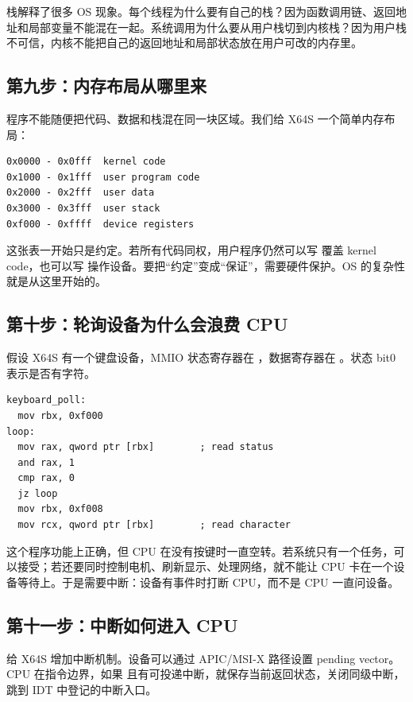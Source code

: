 栈解释了很多 OS 现象。每个线程为什么要有自己的栈？因为函数调用链、返回地址和局部变量不能混在一起。系统调用为什么要从用户栈切到内核栈？因为用户栈不可信，内核不能把自己的返回地址和局部状态放在用户可改的内存里。

\subsection{第九步：内存布局从哪里来}

程序不能随便把代码、数据和栈混在同一块区域。我们给 X64S 一个简单内存布局：

\begin{lstlisting}
0x0000 - 0x0fff  kernel code
0x1000 - 0x1fff  user program code
0x2000 - 0x2fff  user data
0x3000 - 0x3fff  user stack
0xf000 - 0xffff  device registers
\end{lstlisting}

这张表一开始只是约定。若所有代码同权，用户程序仍然可以写  覆盖 kernel code，也可以写  操作设备。要把“约定”变成“保证”，需要硬件保护。OS 的复杂性就是从这里开始的。

\subsection{第十步：轮询设备为什么会浪费 CPU}

假设 X64S 有一个键盘设备，MMIO 状态寄存器在 ，数据寄存器在 。状态 bit0 表示是否有字符。

\begin{lstlisting}
keyboard_poll:
  mov rbx, 0xf000
loop:
  mov rax, qword ptr [rbx]        ; read status
  and rax, 1
  cmp rax, 0
  jz loop
  mov rbx, 0xf008
  mov rcx, qword ptr [rbx]        ; read character
\end{lstlisting}

这个程序功能上正确，但 CPU 在没有按键时一直空转。若系统只有一个任务，可以接受；若还要同时控制电机、刷新显示、处理网络，就不能让 CPU 卡在一个设备等待上。于是需要中断：设备有事件时打断 CPU，而不是 CPU 一直问设备。

\subsection{第十一步：中断如何进入 CPU}

给 X64S 增加中断机制。设备可以通过 APIC/MSI-X 路径设置 pending vector。CPU 在指令边界，如果  且有可投递中断，就保存当前返回状态，关闭同级中断，跳到 IDT 中登记的中断入口。

